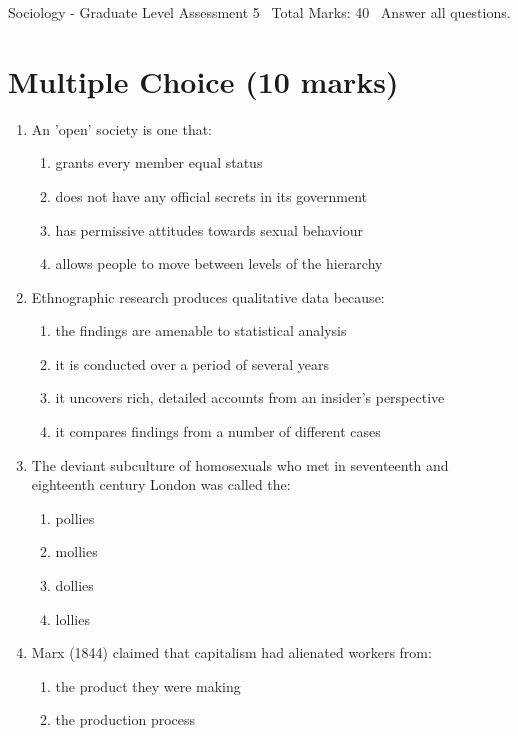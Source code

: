 \documentclass[12pt]{article}
\begin{document}
\begin{center}
Sociology - Graduate Level Assessment 5 \
Total Marks: 40 \
Answer all questions.
\end{center}

\section*{Multiple Choice (10 marks)}
\begin{enumerate}[label=\arabic*.]
\item An 'open' society is one that:
\begin{enumerate}[label=(\alph*)]
    \item grants every member equal status
    \item does not have any official secrets in its government
    \item has permissive attitudes towards sexual behaviour
    \item allows people to move between levels of the hierarchy
\end{enumerate}
\item Ethnographic research produces qualitative data because:
\begin{enumerate}[label=(\alph*)]
    \item the findings are amenable to statistical analysis
    \item it is conducted over a period of several years
    \item it uncovers rich, detailed accounts from an insider's perspective
    \item it compares findings from a number of different cases
\end{enumerate}
\item The deviant subculture of homosexuals who met in seventeenth and eighteenth century London was called the:
\begin{enumerate}[label=(\alph*)]
    \item pollies
    \item mollies
    \item dollies
    \item lollies
\end{enumerate}
\item Marx (1844) claimed that capitalism had alienated workers from:
\begin{enumerate}[label=(\alph*)]
    \item the product they were making
    \item the production process

\end{enumerate}
\end{enumerate}
\end{document}
